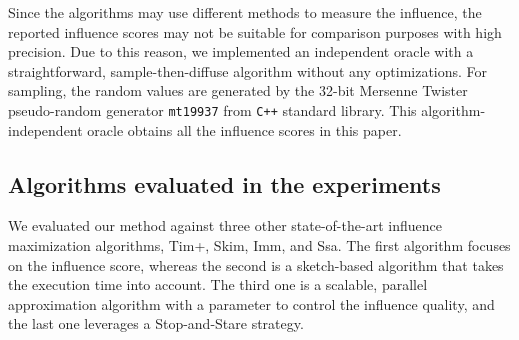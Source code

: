 \documentclass[review]{elsarticle}
\begin{document}
Since the algorithms may use different methods to measure the influence, the reported influence scores may not be suitable for comparison purposes with high precision. Due to this reason, we implemented an independent oracle with a straightforward, sample-then-diffuse algorithm without any optimizations. For sampling, the random values are generated by the 32-bit Mersenne Twister pseudo-random generator {\tt mt19937} from {\tt C++} standard library. This algorithm-independent oracle obtains all the influence scores in this paper.

\subsection{Algorithms evaluated in the experiments}

We evaluated our method against three other state-of-the-art influence maximization algorithms, {\sc Tim+}, {\sc Skim}, {\sc Imm}, and {\sc Ssa}. The first algorithm focuses on the influence score, whereas the second is a sketch-based algorithm that takes the execution time into account. The third one is a scalable, parallel approximation algorithm with a parameter to control the influence quality, and the last one leverages a Stop-and-Stare strategy.
\end{document}
